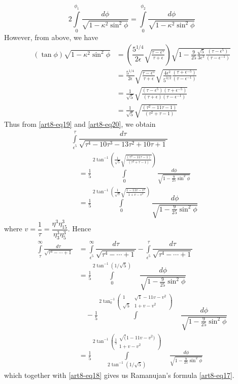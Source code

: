 \begin{equation}
2\int\limits^{\phi_{1}}_{0}\dfrac{d\phi}{\sqrt{1-\kappa^{2}\sin^{2}\phi}}=\int\limits^{\phi_{2}}_{0}\dfrac{d\phi}{\sqrt{1-\kappa^{2}\sin^{2}\phi}}\label{art8-eq20}
\end{equation}
However, from above, we have
\begin{align*}
(\tan \phi)\sqrt{1-\kappa^{2}\sin^{2}\phi} &=\left(\dfrac{5^{1/4}}{2\epsilon}\sqrt{\frac{\tau-\epsilon^{5}}{\tau+\epsilon}}\right)\sqrt{1-\frac{9}{25}\frac{\sqrt{5}}{3\epsilon^{3}}\frac{(\tau-\epsilon^{5})}{(\tau-\epsilon^{-1})}}\\
&= \frac{5^{1/4}}{2\epsilon}\sqrt{\frac{\tau-\epsilon^{5}}{\tau+\epsilon}}\sqrt{\frac{4\epsilon^{2}}{5^{3/2}}\frac{(\tau+\epsilon^{-5})}{(\tau-\epsilon^{-1})}}\\
&= \frac{1}{\sqrt{5}}\sqrt{\frac{(\tau-\epsilon^{5})(\tau+\epsilon^{-5})}{(\tau+\epsilon)(\tau-\epsilon^{-1})}}\\
&= \frac{1}{\sqrt{5}}\sqrt{\frac{(\tau^{2}-11\tau-1)}{(\tau^{2}+\tau-1)}}
\end{align*}\pageoriginale
Thus from \eqref{art8-eq19} and \eqref{art8-eq20}, we obtain
\begin{align*}
&\int\limits^{\tau}_{\epsilon^{5}}\dfrac{d\tau}{\sqrt{\tau^{4}-10\tau^{3}-13\tau^{2}+10\tau+1}}\\
 &\quad = \frac{1}{5}\int\limits^{2\tan^{-1}\left(\frac{1}{\sqrt{5}}\sqrt{\frac{(\tau^{2}-11\tau-1)}{(\tau^{2}+\tau-1)}}\right)}_{0}\frac{d\phi}{\sqrt{1-\frac{9}{25}\sin^{2}\phi}}\\
&\quad = \frac{1}{5}\int\limits^{2\tan^{-1}\left(\frac{1}{\sqrt{5}}\sqrt{\frac{1-11v-v^{2}}{1+v-v^{2}}}\right)}_{0}\dfrac{d\phi}{\sqrt{1-\frac{9}{25}\sin^{2}\phi}}
\end{align*}
where $v=\dfrac{1}{\tau}=\dfrac{\eta^{3}\eta^{3}_{15}}{\eta^{3}_{3}\eta^{3}_{5}}$. Hence
\begin{align*}
\int\limits^{\infty}_{\tau}\frac{d\tau}{\sqrt{\tau^{4}-\cdots+1}} &= \int\limits^{\infty}_{\epsilon^{5}}\dfrac{d\tau}{\sqrt{\tau^{4}-\cdots+1}}-\int\limits^{\tau}_{\epsilon^{5}}\dfrac{d\tau}{\sqrt{\tau^{4}-\cdots+1}}\\
&= \frac{1}{5}\int\limits^{2\tan^{-1}(1/\sqrt{5})}_{0}\quad \dfrac{d\phi}{\sqrt{1-\frac{9}{25}\sin^{2}\phi}}\\
&\quad {}-\frac{1}{5}\int\limits^{2\tan^{-1}_{0}\left(\begin{smallmatrix} 1 & \surd 1-11v-v^{2}\\ \sqrt{5} & 1+v-v^{2}\end{smallmatrix}\right)}\quad \dfrac{d\phi}{\sqrt{1-\frac{9}{25}\sin^{2}\phi}}\\
&=\frac{1}{5}\int\limits^{2\tan^{-1}\left(\frac{1}{5}\begin{smallmatrix} \surd (1-11v-v^{2})\\ 1+v-v^{2}\end{smallmatrix}\right)}_{2\tan^{-1}(1/\sqrt{5})}\quad \frac{d\phi}{\sqrt{1-\frac{9}{25}\sin^{2}\phi}}
\end{align*}
which together with \eqref{art8-eq18} gives us Ramanujan's formula \eqref{art8-eq17}.

